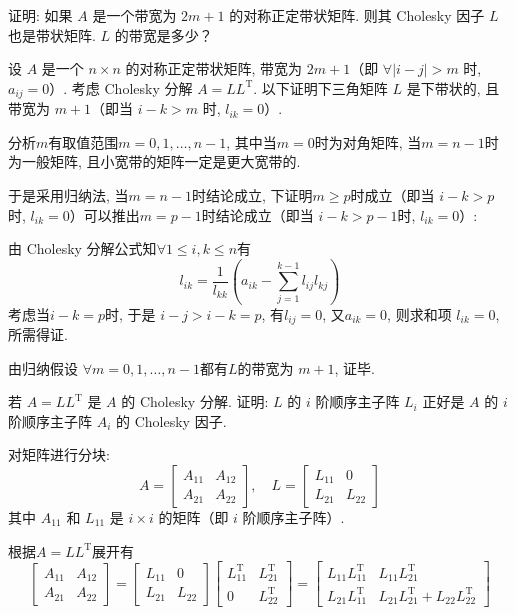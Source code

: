 \documentclass[12pt, answers]{exam}     %
\newcommand{\T}{\mathrm{T}}
\begin{document}
\begin{questions}
\question{}
证明: 如果 \( A \) 是一个带宽为 \( 2m+1 \) 的对称正定带状矩阵. 则其 Cholesky 因子 \( L \) 也是带状矩阵. \( L \) 的带宽是多少？
\begin{solution}
设 \( A \) 是一个 \( n \times n \) 的对称正定带状矩阵, 带宽为 \( 2m + 1 \)（即 \( \forall |i-j| > m \) 时, \( a_{ij} = 0 \)）. 
考虑 Cholesky 分解 \( A = LL^{\T} \). 以下证明下三角矩阵 \( L \) 是下带状的, 且带宽为 \( m+1 \)（即当 \( i - k > m \) 时, \( l_{ik} = 0 \)）. 

分析$m$有取值范围\( m = 0, 1, \ldots, n - 1 \), 其中当\( m = 0 \)时为对角矩阵, 当\( m = n - 1 \)时为一般矩阵, 且小宽带的矩阵一定是更大宽带的.

于是采用归纳法, 当\( m = n - 1 \)时结论成立, 下证明\( m \geq p \)时成立（即当 \( i - k > p \)时,  \( l_{ik} = 0 \)）可以推出\( m = p - 1 \)时结论成立（即当 \( i - k > p - 1 \)时,  \( l_{ik} = 0 \)）:

由 Cholesky 分解公式知\( \forall 1 \le i, k \le n \)有
\[
l_{ik} = \frac{1}{l_{kk}} \left( a_{ik} - \sum_{j=1}^{k-1} l_{ij} l_{kj} \right)
\]
考虑当\( i - k = p \)时, 于是 \( i - j > i - k = p \), 有\( l_{ij} = 0 \), 又\( a_{ik} = 0 \), 则求和项 \( l_{ik} = 0 \), 所需得证.

由归纳假设 \( \forall m = 0, 1, \ldots, n - 1 \)都有$L$的带宽为 \( m+1 \), 证毕.
\end{solution}

\question{}若 \( A = LL^{\T} \) 是 \( A \) 的 Cholesky 分解. 证明: \( L \) 的 \( i \) 阶顺序主子阵 \( L_i \) 正好是 \( A \) 的 \( i \) 阶顺序主子阵 \( A_i \) 的 Cholesky 因子. 

\begin{solution}
对矩阵进行分块:
\[
A = \begin{bmatrix}
A_{11} & A_{12} \\
A_{21} & A_{22}
\end{bmatrix}, \quad
L = \begin{bmatrix}
L_{11} & 0 \\
L_{21} & L_{22}
\end{bmatrix}
\]
其中 \( A_{11} \) 和 \( L_{11} \) 是 \( i \times i \) 的矩阵（即 \( i \) 阶顺序主子阵）.

根据\( A = LL^{\T} \)展开有 
\[
\begin{bmatrix}
A_{11} & A_{12} \\
A_{21} & A_{22}
\end{bmatrix}
= 
\begin{bmatrix}
L_{11} & 0 \\
L_{21} & L_{22}
\end{bmatrix}
\begin{bmatrix}
L_{11}^{\T} & L_{21}^{\T} \\
0 & L_{22}^{\T}
\end{bmatrix}
= 
\begin{bmatrix}
L_{11}L_{11}^{\T} & L_{11}L_{21}^{\T} \\
L_{21}L_{11}^{\T} & L_{21}L_{21}^{\T} + L_{22}L_{22}^{\T}
\end{bmatrix}
\]


\end{solution}
\end{questions}
\end{document}
